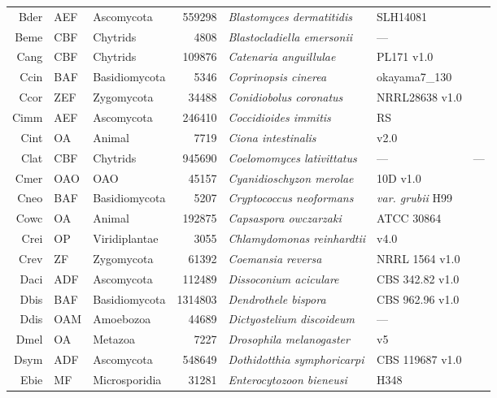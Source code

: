 {{{\begin{longtable}{rllrlll}
  Bder & AEF & Ascomycota & 559298 & \emph{Blastomyces dermatitidis} & SLH14081 & \cite{McCullough2000} \\ 
  Beme & CBF & Chytrids & 4808 & \emph{Blastocladiella emersonii} & --- & \cite{Ribichich2005} \\ 
  Cang & CBF & Chytrids & 109876 & \emph{Catenaria anguillulae} & PL171 v1.0 & \cite{Cang} \\ 
  Ccin & BAF & Basidiomycota & 5346 & \emph{Coprinopsis cinerea} & okayama7\_130 & \cite{Stajich2010Ccin} \\ 
  Ccor & ZEF & Zygomycota & 34488 & \emph{Conidiobolus coronatus} & NRRL28638 v1.0 & \cite{Chang2015} \\ 
  Cimm & AEF & Ascomycota & 246410 & \emph{Coccidioides immitis} & RS & \cite{Sharpton2009} \\ 
  Cint & OA & Animal & 7719 & \emph{Ciona intestinalis} & v2.0 & \cite{Cint} \\ 
  Clat & CBF & Chytrids & 945690 & \emph{Coelomomyces lativittatus} & --- & --- \\ 
  Cmer & OAO & OAO & 45157 & \emph{Cyanidioschyzon merolae} & 10D v1.0 & \cite{Matsuzaki2004} \\ 
  Cneo & BAF & Basidiomycota & 5207 & \emph{Cryptococcus neoformans} & \textit{var. grubii} H99 & \cite{Cneo} \\ 
  Cowc & OA & Animal & 192875 & \emph{Capsaspora owczarzaki} & ATCC 30864 & \cite{RuizTrillo2007} \\ 
  Crei & OP & Viridiplantae & 3055 & \emph{Chlamydomonas reinhardtii} & v4.0 & \cite{Merchant2007} \\ 
  Crev & ZF & Zygomycota & 61392 & \emph{Coemansia reversa} & NRRL 1564 v1.0 & \cite{Chang2015} \\ 
  Daci & ADF & Ascomycota & 112489 & \emph{Dissoconium aciculare} & CBS 342.82 v1.0 & \cite{Daci} \\ 
  Dbis & BAF & Basidiomycota & 1314803 & \emph{Dendrothele bispora} & CBS 962.96 v1.0 & \cite{Dbis} \\ 
  Ddis & OAM & Amoebozoa & 44689 & \emph{Dictyostelium discoideum} & --- & \cite{Eichinger2005} \\ 
  Dmel & OA & Metazoa & 7227 & \emph{Drosophila melanogaster} & v5 & \cite{DosSantos2015} \\ 
  Dsym & ADF & Ascomycota & 548649 & \emph{Dothidotthia symphoricarpi} & CBS 119687 v1.0 & \cite{Dsym} \\ 
  Ebie & MF & Microsporidia & 31281 & \emph{Enterocytozoon bieneusi} & H348 & \cite{Corradi2007} \\ 

\end{longtable}}}}
